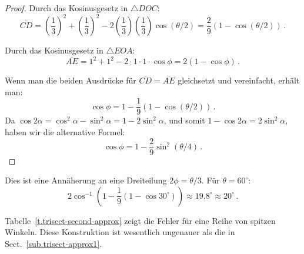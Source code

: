 \begin{proof} Durch das Kosinusgesetz in $\triangle DOC$:
\[
\overline{CD}= \left(\frac{1}{3}\right)^2+\left(\frac{1}{3}\right)^2-2\left(\frac{1}{3}\right)\left(\frac{1}{3}\right)\cos (\theta/2)=\frac{2}{9}(1-\cos(\theta/2))\,.
\]

Durch das Kosinusgesetz in $\triangle EOA$:
\[
\overline{AE} = 1^2+1^2-2\cdot 1\cdot 1\cdot \cos \phi=2(1-\cos \phi)\,.
\]

Wenn man die beiden Ausdrücke für $\overline{CD}=\overline{AE}$ gleichsetzt und vereinfacht, erhält man:
\[
\cos \phi = 1 - \frac{1}{9}(1-\cos(\theta/2))\,.
\]
Da $\cos 2\alpha= \cos^2 \alpha-\sin^2\alpha=1-2\sin^2\alpha$, und somit $1-\cos 2\alpha=2\sin^2\alpha$, haben wir die alternative Formel:
\[
\cos \phi = 1 - \frac{2}{9}\sin^2(\theta/4)\,.
\]
\end{proof}

Dies ist eine Annäherung an eine Dreiteilung $2\phi=\theta/3$. Für $\theta=60^\circ$:
\[
2\cos^{-1}\left(1 - \frac{1}{9}(1-\cos 30^\circ)\right)\approx 19.8^\circ\approx 20^\circ\,.
\]

Tabelle~\ref{t.trisect-second-approx} zeigt die Fehler für eine Reihe von spitzen Winkeln. Diese Konstruktion ist wesentlich ungenauer als die in Sect.~\ref{sub.trisect-approx1}.

